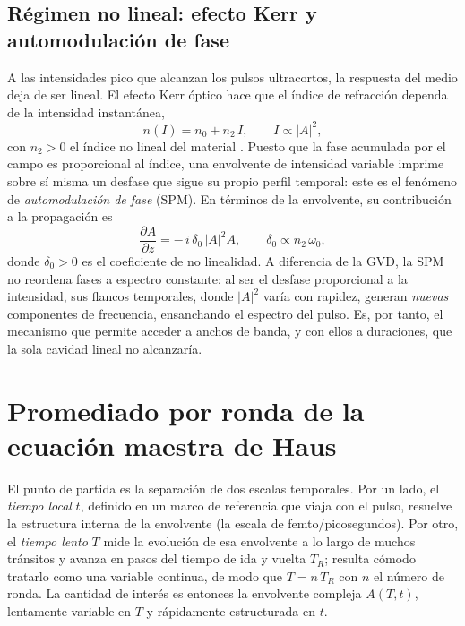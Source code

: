 \section{Régimen no lineal: efecto Kerr y automodulación de fase}

A las intensidades pico que alcanzan los pulsos ultracortos, la respuesta del
medio deja de ser lineal. El efecto Kerr óptico hace que el índice de refracción
dependa de la intensidad instantánea,
%
\begin{equation}
    n(I) = n_0 + n_2\,I,
    \qquad I \propto |A|^2,
    \label{eq:kerr}
\end{equation}
%
con $n_2>0$ el índice no lineal del material \cite[sec.~4.1.1]{Keller2022}. Puesto que la fase
acumulada por el campo es proporcional al índice, una envolvente de intensidad
variable imprime sobre sí misma un desfase que sigue su propio perfil temporal:
este es el fenómeno de \emph{automodulación de fase} (SPM). En términos de la
envolvente, su contribución a la propagación es
%
\begin{equation}
    \frac{\partial A}{\partial z}
    = -\,i\,\delta_0\,|A|^2 A,
    \qquad \delta_0 \propto n_2\,\omega_0,
    \label{eq:spm_prop}
\end{equation}
%
donde $\delta_0>0$ es el coeficiente de no linealidad. A diferencia de la GVD, la
SPM no reordena fases a espectro constante: al ser el desfase proporcional a la
intensidad, sus flancos temporales, donde $|A|^2$ varía con rapidez, generan
\emph{nuevas} componentes de frecuencia, ensanchando el espectro del pulso. Es,
por tanto, el mecanismo que permite acceder a anchos de banda, y con ellos a
duraciones, que la sola cavidad lineal no alcanzaría.

\chapter{Promediado por ronda de la ecuación maestra de Haus}
\label{app:promediado}

El punto de partida es la separación de dos escalas temporales. Por un lado, el
\emph{tiempo local} $t$, definido en un marco de referencia que viaja con el
pulso, resuelve la estructura interna de la envolvente (la escala de
femto\-/picosegundos). Por otro, el \emph{tiempo lento} $T$ mide la evolución de
esa envolvente a lo largo de muchos tránsitos y avanza en pasos del tiempo de ida
y vuelta $T_R$; resulta cómodo tratarlo como una variable continua, de modo que
$T = n\,T_R$ con $n$ el número de ronda. La cantidad de interés es entonces la
envolvente compleja $A(T,t)$, lentamente variable en $T$ y rápidamente
estructurada en $t$.

